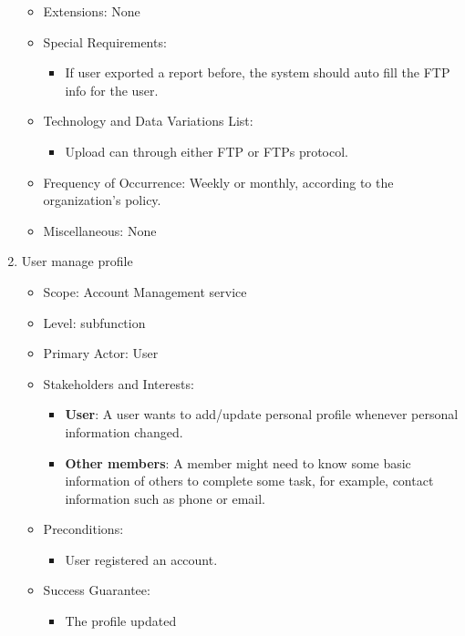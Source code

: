 \documentclass[12pt, a4paper]{article}
\begin{document}
\begin{CJK*}{UTF8}{bkai}
\begin{enumerate}
\begin{itemize}
          \item Extensions: None
          \item Special Requirements:
            \begin{itemize}
              \item If user exported a report before, the system should auto fill the FTP info for the user.
            \end{itemize}
          \item Technology and Data Variations List:
            \begin{itemize}
              \item Upload can through either FTP or FTPs protocol.
            \end{itemize}
          \item Frequency of Occurrence: Weekly or monthly, according to the organization's policy.
          \item Miscellaneous: None
        \end{itemize}
      \item User manage profile
        \begin{itemize}
          \item Scope: Account Management service
          \item Level: subfunction
          \item Primary Actor: User
          \item Stakeholders and Interests:
            \begin{itemize}
              \item {\bf User}: A user wants to add/update personal profile whenever personal information changed.
              \item {\bf Other members}: A member might need to know some basic information of others to complete some task, for example, contact information such as phone or email.
            \end{itemize}
          \item Preconditions:
            \begin{itemize}
              \item User registered an account.
            \end{itemize}
          \item Success Guarantee:
            \begin{itemize}
              \item The profile updated
            \end{itemize}

\end{itemize}
\end{enumerate}
\end{CJK*}
\end{document}
